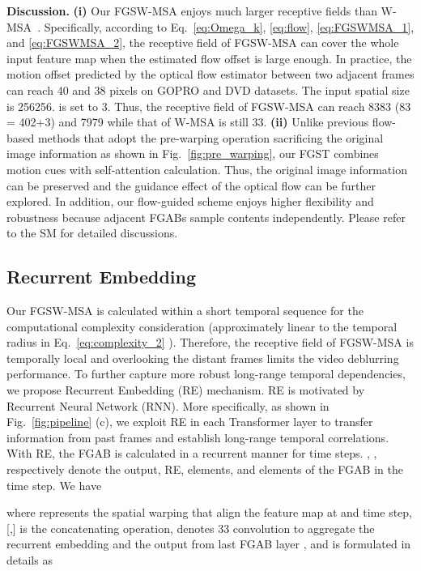 \documentclass{article}
\begin{document}
	\noindent\textbf{Discussion.} \textbf{(i)} Our FGSW-MSA enjoys much larger receptive fields than W-MSA~\cite{liu2021swin}. Specifically, according to Eq.~\eqref{eq:Omega_k}, \eqref{eq:flow}, \eqref{eq:FGSWMSA_1}, and \eqref{eq:FGSWMSA_2}, the receptive field of FGSW-MSA can cover the whole input feature map when the estimated flow offset is large enough. In practice, the motion offset predicted by the optical flow estimator between two adjacent frames can reach 40 and 38 pixels on GOPRO and DVD datasets. The input spatial size is 256256.  is set to 3. Thus, the receptive field of FGSW-MSA can reach 8383 (83 = 402+3) and 7979 while that of W-MSA is still 33. \textbf{(ii)} Unlike previous flow-based methods that adopt the pre-warping operation sacrificing the original image information as shown in Fig.~\ref{fig:pre_warping}, our FGST combines motion cues with self-attention calculation. Thus, the original image information can be preserved and the guidance effect of the optical flow can be further explored. In addition, our flow-guided scheme enjoys higher flexibility and robustness because adjacent FGABs sample contents independently. Please refer to the SM for detailed discussions. 
	
	
	\subsection{Recurrent Embedding}
Our FGSW-MSA is calculated within a short temporal sequence for the computational complexity consideration (approximately linear to the temporal radius  in Eq.~\eqref{eq:complexity_2} ).  Therefore, the receptive field of FGSW-MSA is temporally local and overlooking the distant frames limits the video deblurring  performance. To further capture more robust long-range temporal dependencies, we propose Recurrent Embedding (RE) mechanism. RE is motivated by Recurrent Neural Network (RNN). More specifically, as shown in Fig.~\ref{fig:pipeline} (c), we exploit RE in each Transformer layer to transfer information from past frames and establish long-range temporal correlations. With RE, the FGAB is calculated in a recurrent manner for  time steps. , ,  respectively denote the output, RE,  elements, and  elements of the  FGAB in the  time step. We have
	\vspace{-1.5mm}
	
	where  represents the spatial warping that align the feature map at  and  time step, [,] is the concatenating operation,  denotes 33 convolution to aggregate the recurrent embedding  and the output from last FGAB layer , and  is formulated in details as
	\vspace{-1.5mm}
	
\end{document}
